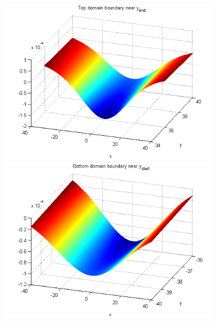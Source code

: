 \documentclass[11pt,a4paper,twoside]{article}
\begin{document}
\begin{figure}[ht]
	\begin{minipage}[b]{0.5\linewidth}
		\raggedleft
		\includegraphics[width=\linewidth]{Pictures/TopBoundary.png}
	\end{minipage}	
	\begin{minipage}[b]{0.5\linewidth}
		\raggedright
		 \includegraphics[width=\linewidth]{Pictures/BottomBoundary.png}
	\end{minipage}
	\begin{minipage}[b]{0.5\linewidth}
		\raggedleft

\end{minipage}
\end{figure}
\end{document}
